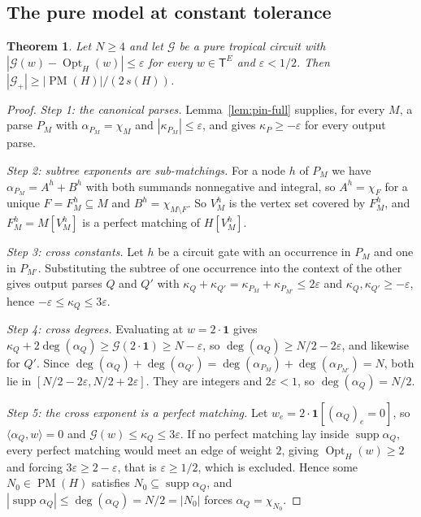 \documentclass[11pt]{article}
\newtheorem{theorem}{Theorem}[section]
\newcommand{\Opt}{\operatorname{Opt}}
\newcommand{\PM}{\operatorname{PM}}
\begin{document}
\subsection{The pure model at constant tolerance}

\begin{theorem}
\label{thm:pure-full}
Let $N\ge4$ and let $\mathcal G$ be a pure tropical circuit with
$|\mathcal G(w)-\Opt_H(w)|\le\varepsilon$ for every $w\in\mathsf T^{E}$ and
$\varepsilon<1/2$.  Then $|\mathcal G_+|\ge|\PM(H)|/(2\,s(H))$.
\end{theorem}

\begin{proof}
\emph{Step 1: the canonical parses.}
Lemma~\ref{lem:pin-full} supplies, for every $M$, a parse $P_M$ with
$\alpha_{P_M}=\chi_M$ and $|\kappa_{P_M}|\le\varepsilon$, and gives
$\kappa_P\ge-\varepsilon$ for every output parse.

\emph{Step 2: subtree exponents are sub-matchings.}
For a node $h$ of $P_M$ we have $\alpha_{P_M}=A^h+B^h$ with both summands
nonnegative and integral, so $A^h=\chi_F$ for a unique $F=F^h_M\subseteq M$ and
$B^h=\chi_{M\setminus F}$.  So $V^h_M$ is the vertex set covered by
$F^h_M$, and $F^h_M=M[V^h_M]$ is a perfect matching of $H[V^h_M]$.

\emph{Step 3: cross constants.}
Let $h$ be a circuit gate with an occurrence in $P_M$ and one in $P_{M'}$.
Substituting the subtree of one occurrence into the context of the other gives
output parses $Q$ and $Q'$ with
$\kappa_Q+\kappa_{Q'}=\kappa_{P_M}+\kappa_{P_{M'}}\le2\varepsilon$ and
$\kappa_Q,\kappa_{Q'}\ge-\varepsilon$, hence
$-\varepsilon\le\kappa_Q\le3\varepsilon$.

\emph{Step 4: cross degrees.}
Evaluating at $w=2\cdot\mathbf1$ gives
$\kappa_Q+2\deg(\alpha_Q)\ge\mathcal G(2\cdot\mathbf1)\ge N-\varepsilon$, so
$\deg(\alpha_Q)\ge N/2-2\varepsilon$, and likewise for $Q'$.  Since
$\deg(\alpha_Q)+\deg(\alpha_{Q'})=\deg(\alpha_{P_M})+\deg(\alpha_{P_{M'}})=N$,
both lie in $[N/2-2\varepsilon,N/2+2\varepsilon]$.  They are integers and
$2\varepsilon<1$, so $\deg(\alpha_Q)=N/2$.

\emph{Step 5: the cross exponent is a perfect matching.}
Let $w_e=2\cdot\mathbf1[(\alpha_Q)_e=0]$, so $\langle\alpha_Q,w\rangle=0$ and
$\mathcal G(w)\le\kappa_Q\le3\varepsilon$.  If no perfect matching lay inside
$\operatorname{supp}\alpha_Q$, every perfect matching would meet an edge of
weight $2$, giving $\Opt_H(w)\ge2$ and forcing $3\varepsilon\ge2-\varepsilon$,
that is $\varepsilon\ge1/2$, which is excluded.  Hence some $N_0\in\PM(H)$
satisfies
$N_0\subseteq\operatorname{supp}\alpha_Q$, and
$|\operatorname{supp}\alpha_Q|\le\deg(\alpha_Q)=N/2=|N_0|$ forces
$\alpha_Q=\chi_{N_0}$.


\end{proof}
\end{document}
